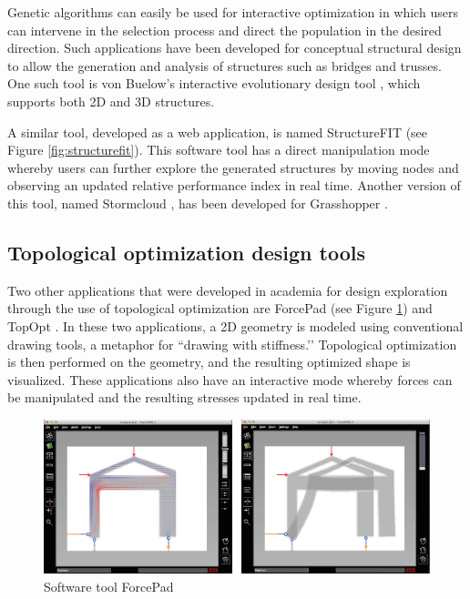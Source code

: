 Genetic algorithms can easily be used for interactive optimization in which users can intervene in the selection process and direct the population in the desired direction. Such applications have been developed for conceptual structural design to allow the generation and analysis of structures such as bridges and trusses. One such tool is von Buelow’s interactive evolutionary design tool \cite{VonBuelow2008}, which supports both 2D and 3D structures.

A similar tool, developed as a web application, is named StructureFIT \cite{Mueller2013, Mueller2015} (see Figure \ref{fig:structurefit}). This software tool has a direct manipulation mode whereby users can further explore the generated structures by moving nodes and observing an updated relative performance index in real time. Another version of this tool, named Stormcloud \cite{Danhaive2015}, has been developed for Grasshopper \cite{Grasshopper}.

\subsection{Topological optimization design tools}
Two other applications that were developed in academia for design exploration through the use of topological optimization are ForcePad \cite{Lindemann2004} (see Figure \ref{fig:forcepad}) and TopOpt \cite{Aage2013}. In these two applications, a 2D geometry is modeled using conventional drawing tools, a metaphor for ``drawing with stiffness.’’ Topological optimization is then performed on the geometry, and the resulting optimized shape is visualized. These applications also have an interactive mode whereby forces can be manipulated and the resulting stresses updated in real time.

\begin{figure}
  \includegraphics[width=350pt]{graphics/forcepad.png}
  \caption{Software tool ForcePad}
  \label{fig:forcepad}
\end{figure}

